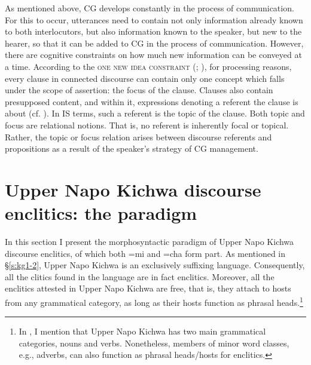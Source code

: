 \documentclass[output=paper]{langscibook}
\begin{document}
As mentioned above, CG develops constantly in the process of communication. For this to occur, utterances need to contain not only information already known to both interlocutors, but also information known to the speaker, but new to the hearer, so that it can be added to CG in the process of communication. However, there are cognitive constraints on how much new information can be conveyed at a time. According to the \textsc{one new idea constraint} (\citealt{Chafe1987}; \citeyear{Chafe1994}), for processing reasons, every clause in connected discourse can contain only one concept which falls under the scope of assertion: the focus of the clause. Clauses also contain presupposed content, and within it, expressions denoting a referent the clause is about (cf. \citealt[127]{Lambrecht1994}). In IS terms, such a referent is the topic of the clause. Both topic and focus are relational notions. That is, no referent is inherently focal or topical. Rather, the topic or focus relation arises between discourse referents and propositions as a result of the speaker’s strategy of CG management.


\section{Upper Napo Kichwa discourse enclitics: the paradigm}\label{s:kg2}

In this section I present the morphosyntactic paradigm of Upper Napo Kichwa discourse enclitics, of which both =mi and =cha form part. As mentioned in §‎\ref{s:kg1-2}, Upper Napo Kichwa is an exclusively suffixing language. Consequently, all the clitics found in the language are in fact enclitics. Moreover, all the enclitics attested in Upper Napo Kichwa are free, that is, they attach to hosts from any grammatical category, as long as their hosts function as phrasal heads.\footnote{In , I mention that Upper Napo Kichwa has two main grammatical categories, nouns and verbs. Nonetheless, members of minor word classes, e.g., adverbs, can also function as phrasal heads/hosts for enclitics.}
\end{document}
